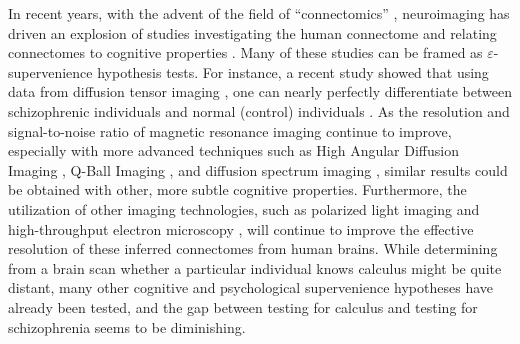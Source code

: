 \documentclass{article}
\newcommand{\eps}{\varepsilon}
\begin{document}
In recent years, with the advent of the field of ``connectomics'' \cite{SpornsKotter05,Hagmann05}, neuroimaging has driven an explosion of studies investigating the human connectome and relating connectomes to cognitive properties \cite{Sporns10}. %
Many of these studies can be framed as $\eps$-supervenience hypothesis tests.  For instance, a recent study showed that using data from diffusion tensor imaging \cite{Basser94}, one can nearly perfectly differentiate between schizophrenic individuals and normal (control) individuals \cite{ArdekaniSzeszko10}.  As the resolution and signal-to-noise ratio of magnetic resonance imaging continue to improve, especially with more advanced techniques such as High Angular Diffusion Imaging \cite{TuchWedeen02}, Q-Ball Imaging \cite{Tuch04}, and diffusion spectrum imaging \cite{WedeenWeisskoff05}, similar results could be obtained with other, more subtle cognitive properties.  Furthermore, the utilization of other imaging technologies, such as polarized light imaging \cite{PalmAmunts10} and high-throughput electron microscopy \cite{DenkHorstmann04,HayworthLichtman06}, will continue to improve the effective resolution of these inferred connectomes from human brains. While determining from a brain scan whether a particular individual knows calculus might be quite distant, many other cognitive and psychological supervenience hypotheses have already been tested, and the gap between testing for calculus and testing for schizophrenia seems to be diminishing.
\end{document}
